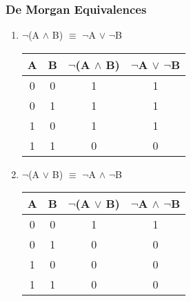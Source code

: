 \documentclass[12pt]{article}
\begin{document}
\subsubsection{De Morgan Equivalences}

\begin{enumerate}



  \item $\neg$(A $\land$ B) $\equiv$ $\neg$A $\lor$ $\neg$B



\begin{center}

  \begin{tabular}{| c | c | c | c |}

    \hline

    A & B & $\neg$(A $\land$ B) & $\neg$A $\lor$ $\neg$B \\ \hline

    0 & 0 & 1 & 1 \\

    0 & 1 & 1 & 1 \\ 

    1 & 0 & 1 & 1 \\

    1 & 1 & 0 & 0 \\ \hline

  \end{tabular}

\end{center}



  \item $\neg$(A $\lor$ B) $\equiv$ $\neg$A $\land$ $\neg$B



\begin{center}

  \begin{tabular}{| c | c | c | c |}

    \hline

    A & B & $\neg$(A $\lor$ B) & $\neg$A $\land$ $\neg$B \\ \hline

    0 & 0 & 1 & 1 \\

    0 & 1 & 0 & 0 \\ 

    1 & 0 & 0 & 0 \\

    1 & 1 & 0 & 0 \\ \hline

  \end{tabular}

\end{center}



\end{enumerate}
\end{document}
